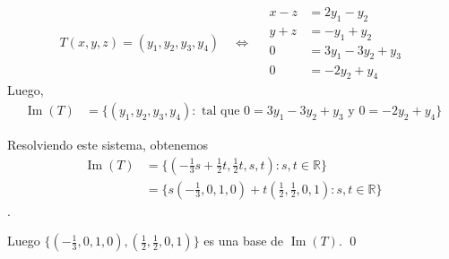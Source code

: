 \documentclass{beamer} %
\newcommand{\img}{\operatorname{Im}}
\newcommand{\nuc}{\operatorname{Nu}}
\newcommand{\R}{\mathbb R}
\begin{document}


        

        \begin{frame}
            
            \begin{equation*}\label{eq-gen}
                T(x,y,z) = (y_1,y_2,y_3,y_4) \quad\Leftrightarrow \quad
                \begin{array}{rl}
                x -z &= 2y_1-y_2\\ 
                y +z &= -y_1+y_2\\
                0&=3y_1-3y_2+y_3 \\
                0&= -2y_2 +y_4
                \end{array}
                \end{equation*} 
            Luego, 
            \begin{align*}
                \img(T) &=  \{(y_1,y_2,y_3,y_4): \text{ tal que $0=3y_1-3y_2+y_3$ y $0= -2y_2 +y_4$} \} 
            \end{align*}
            
            
            Resolviendo este sistema, obtenemos
            \begin{align*}
                \img(T) &=  \{(-\frac13 s + \frac12 t, \frac 12 t, s,t): s,t \in \R \}\\
                &=  \{s(-\frac13,0,1,0)+t(\frac12,\frac12,0,1): s,t \in \R \}
            \end{align*}
            .
            
            Luego $\{(-\frac13,0,1,0),(\frac12,\frac12,0,1) \}$ es una base de $\img(T)$. \qed
            
           
\end{frame}
\end{document}
